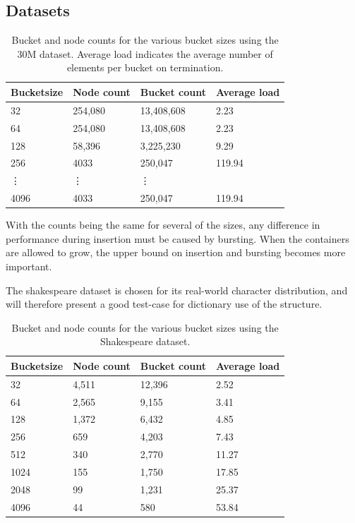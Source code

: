\subsection{Datasets}

\begin{table}[h]
    \centering
    \begin{tabular}[here]{ l l l l }
        \hline
        Bucketsize& Node count  & Bucket count & Average load  \\\hline
        32        &  254,080    & 13,408,608   & 2.23\\
        64        &  254,080    & 13,408,608   & 2.23\\
        128       &  58,396     & 3,225,230    & 9.29\\
        256       &  4033       & 250,047      & 119.94\\
        \vdots    &  \vdots     & \vdots       &\\
        4096      &  4033       & 250,047      & 119.94\\\hline 
    \end{tabular}
    \caption{Bucket and node counts for the various bucket sizes using the
        30M dataset. Average load indicates the average number of elements
        per bucket on termination.}
    \label{tab:bncounts_30M}
\end{table}

With the counts being the same for several of the sizes, any difference in performance
during insertion must be caused by bursting. When the containers are allowed to grow,
the upper bound on insertion and bursting becomes more important.

The shakespeare dataset is chosen for its real-world character distribution, and will
therefore present a good test-case for dictionary use of the structure.

\begin{table}[h]
    \centering
    \begin{tabular}[here]{ l l l l }
        \hline
        Bucketsize&  Node count & Bucket count& Average load  \\\hline
        32        &  4,511      & 12,396      & 2.52 \\
        64        &  2,565      & 9,155       & 3.41 \\
        128       &  1,372      & 6,432       & 4.85 \\
        256       &  659        & 4,203       & 7.43 \\
        512       &  340        & 2,770       & 11.27\\
        1024      &  155        & 1,750       & 17.85\\ 
        2048      &  99         & 1,231       & 25.37\\ 
        4096      &  44         & 580         & 53.84\\\hline 
    \end{tabular}
    \caption{Bucket and node counts for the various bucket sizes using the Shakespeare
        dataset.}
    \label{tab:bncounts_shakespeare}
\end{table}


